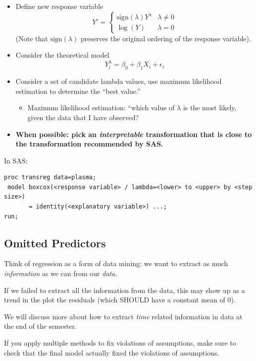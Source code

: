 \documentclass[12pt]{../notes}
\begin{document}
\begin{itemize}
\item Define new response variable 
\[Y' = 
\begin{cases} 
\text{sign}(\lambda)Y^\lambda & \lambda \ne 0 \\
\log(Y) & \lambda = 0
\end{cases}
\]
(Note that $\text{sign}(\lambda)$ preserves the original ordering of the response variable). 
\item Consider the theoretical model
\[Y_i^\lambda = \beta_0 + \beta_1X_i + \epsilon_i\]
\item Consider a set of candidate lambda values, use maximum likelihood estimation to determine the ``best value.''
\begin{itemize}
\item Maximum likelihood estimation: ``which value of $\lambda$ is the most likely, given the data that I have observed?
\end{itemize}
\item \textbf{When possible: pick an \textit{interpretable} transformation that is close to the transformation recommended by SAS.}

\begin{minipage}[l][1cm][c]{\textwidth}
\end{minipage}

\end{itemize}

In SAS:
\begin{verbatim}
proc transreg data=plasma;
 model boxcox(<response variable> / lambda=<lower> to <upper> by <step size>) 
       = identity(<explanatory variable>) ...;
run;
\end{verbatim}

\subsection*{Omitted Predictors}
Think of regression as a form of data mining: we want to extract as much \textit{information} as we can from our \textit{data}.

\nspace
If we failed to extract all the information from the data, this may show up as a trend in the plot the residuals (which SHOULD have a constant mean of 0). 

\nspace
We will discuss more about how to extract \textit{time} related information in data at the end of the semester. 

\nspace
If you apply multiple methods to fix violations of assumptions, make sure to check that the final model actually fixed the violations of assumptions. 
















\end{document}
